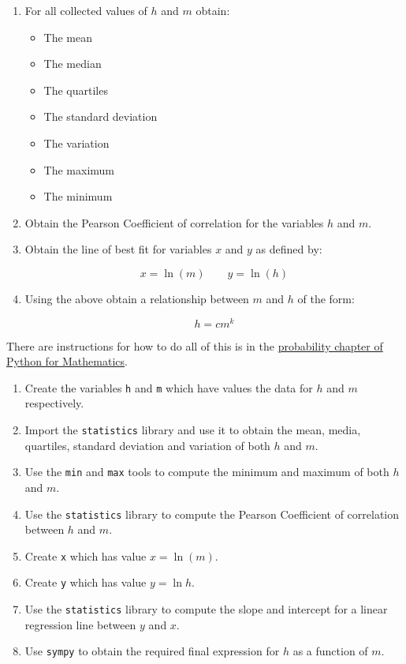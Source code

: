 \documentclass{article}
\begin{document}
\begin{enumerate}
    \item For all collected values of $h$ and $m$ obtain:

    \begin{itemize}
        \item The mean
        \item The median
        \item The quartiles
        \item The standard deviation
        \item The variation
        \item The maximum
        \item The minimum
    \end{itemize}

\item Obtain the Pearson Coefficient of correlation for the variables $h$ and $m$.
\item Obtain the line of best fit for variables $x$ and $y$ as
   defined by:

   $$x=\ln(m)\qquad y=\ln(h)$$

\item Using the above obtain a relationship between $m$ and $h$ of the form:

   $$h=cm^k$$
\end{enumerate}

There are instructions for how to do all of this is in the
\href{https://vknight.org/pfm/tools-for-mathematics/08-statistics/how/main.html}{probability chapter of Python for Mathematics}.


\begin{enumerate}
    \item Create the variables \texttt{h} and \texttt{m}
        which have values the data for $h$ and $m$ respectively.
    \item Import the \texttt{statistics} library and use it to
        obtain the mean, media, quartiles, standard deviation and variation of
        both $h$ and $m$.
    \item Use the \texttt{min} and \texttt{max} tools to
        compute the minimum and maximum of both $h$ and $m$.
    \item Use the \texttt{statistics} library to compute the Pearson
        Coefficient of correlation between $h$ and $m$.
    \item Create \texttt{x} which has value $x=\ln(m)$.
    \item Create \texttt{y} which has value $y=\ln{h}$.
    \item Use the \texttt{statistics} library to compute the slope
        and intercept for a linear regression line between $y$ and $x$.
    \item Use \texttt{sympy} to obtain the required final expression
        for $h$ as a function of $m$.
\end{enumerate}
\end{document}
